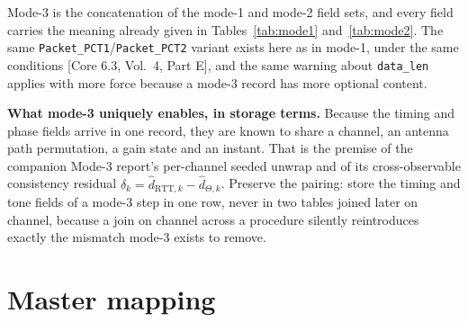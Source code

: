 \documentclass[11pt,a4paper]{article}
\newcommand{\code}[1]{\texttt{\small #1}}
\newcommand{\RTT}{\ensuremath{\mathrm{RTT}}}
\newcommand{\core}[1]{\textcolor{rulegrey}{\small[Core 6.3, #1]}}
\begin{document}
Mode-3 is the concatenation of the mode-1 and mode-2 field sets, and every field carries the meaning
already given in Tables~\ref{tab:mode1} and~\ref{tab:mode2}. The same
\code{Packet\_\allowbreak{}PCT1}/\code{Packet\_\allowbreak{}PCT2} variant exists here as in mode-1, under the same conditions
\core{Vol.\ 4, Part E}, and the same warning about \code{data\_\allowbreak{}len} applies with more force because a
mode-3 record has more optional content.

\begin{callout}
\textbf{What mode-3 uniquely enables, in storage terms.} Because the timing and phase fields arrive
in one record, they are known to share a channel, an antenna path permutation, a gain state and an
instant. That is the premise of the companion Mode-3 report's per-channel seeded unwrap and of its
cross-observable consistency residual $\delta_k = \hat d_{\RTT,k} - \hat d_{\Theta,k}$. Preserve the
pairing: store the timing and tone fields of a mode-3 step in one row, never in two tables joined
later on channel, because a join on channel across a procedure silently reintroduces exactly the
mismatch mode-3 exists to remove.
\end{callout}

\section{Master mapping}
\label{sec:master}
\end{document}
